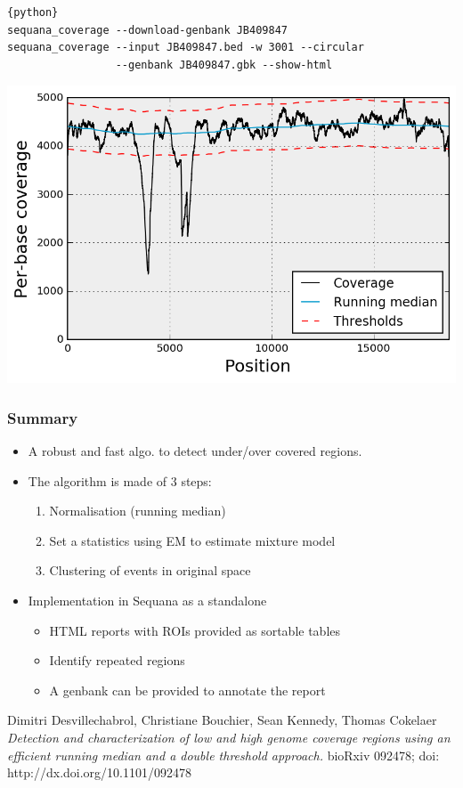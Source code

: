 \documentclass{beamer}
\begin{document}
\begin{frame}[fragile]
\begin{lstlisting}{python}
sequana_coverage --download-genbank JB409847
sequana_coverage --input JB409847.bed -w 3001 --circular 
                 --genbank JB409847.gbk --show-html
\end{lstlisting}
\includegraphics[height=0.7\textheight, 
    width=1\textwidth]{images/virus.png}
\end{frame}


\begin{frame}
 \frametitle{Summary}
 \begin{itemize}
    \item A robust and fast algo. to detect under/over covered regions.

    \item The algorithm is made of 3 steps:
    \begin{enumerate}
        \item Normalisation (running median)
        \item Set a statistics using EM to estimate mixture model
        \item Clustering of events in original space
    \end{enumerate}
    \item Implementation in Sequana as a standalone 
    \begin{itemize}
        \item HTML reports with ROIs provided as sortable tables
        \item Identify repeated regions
        \item A genbank can be provided to annotate the report
    \end{itemize}
\end{itemize}
  

 \footnotesize{
Dimitri Desvillechabrol, Christiane Bouchier, Sean Kennedy, Thomas Cokelaer
\textit{Detection and characterization of low and high genome coverage 
regions using an efficient running median and a double threshold approach.}
bioRxiv 092478; doi: http://dx.doi.org/10.1101/092478
}
\end{frame}
\end{document}
